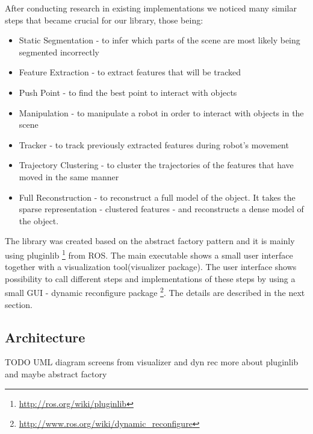After conducting research in existing implementations we noticed many similar steps that became crucial for our library, those being:

\begin{itemize}
\item Static Segmentation - to infer which parts of the scene are most likely being segmented incorrectly
\item Feature Extraction - to extract features that will be tracked
\item Push Point - to find the best point to interact with objects
\item Manipulation - to manipulate a robot in order to interact with objects in the scene
\item Tracker - to track previously extracted features during robot's movement
\item Trajectory Clustering - to cluster the trajectories of the features that have moved in the same manner
\item Full Reconstruction - to reconstruct a full model of the object. It takes the sparse representation - clustered features - and reconstructs a dense model of the object.
\end{itemize}




The library was created based on the abstract factory pattern and it is mainly using pluginlib \footnote{\url{http://ros.org/wiki/pluginlib}} from ROS. The main executable  shows a small user interface together with a visualization tool(visualizer package). The user interface shows possibility to call different steps and implementations of these steps by using a small GUI - dynamic reconfigure package \footnote{\url{http://www.ros.org/wiki/dynamic_reconfigure}}. The details are described in the next section.

\subsection{Architecture}
TODO		
 UML diagram
 screens from visualizer and dyn rec
 more about pluginlib and maybe abstract factory
